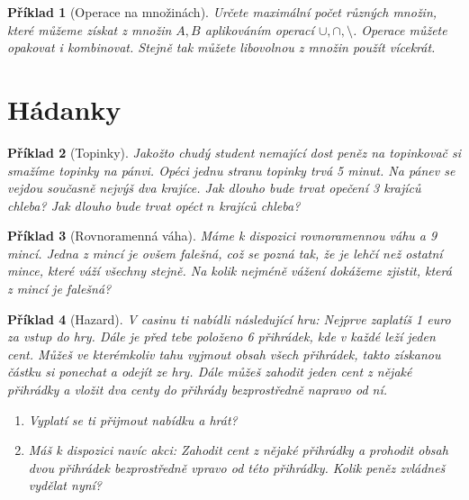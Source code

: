 \documentclass[10pt]{article}
\theoremstyle{definitionstyle}
\theoremstyle{problemstyle}
\newtheorem{problem}{Příklad}
\begin{document}
\begin{problem}[Operace na množinách]
Určete maximální počet různých množin, které můžeme získat z množin $A,B$ aplikováním operací $\cup, \cap, \setminus$. Operace můžete opakovat i kombinovat. Stejně tak můžete libovolnou z množin použít vícekrát.
\end{problem}

\section{Hádanky}

\begin{problem}[Topinky]
Jakožto chudý student nemající dost peněz na topinkovač si smažíme topinky na pánvi. Opéci jednu stranu topinky trvá 5 minut. Na pánev se vejdou současně nejvýš dva krajíce. Jak dlouho bude trvat opečení 3 krajíců chleba? Jak dlouho bude trvat opéct $n$ krajíců chleba?
\end{problem}

\begin{problem}[Rovnoramenná váha]
Máme k dispozici rovnoramennou váhu a 9 mincí. Jedna z mincí je ovšem falešná, což se pozná tak, že je lehčí než ostatní mince, které váží všechny stejně. Na kolik nejméně vážení dokážeme zjistit, která z mincí je falešná?
\end{problem}

\begin{problem}[Hazard]
V casinu ti nabídli následující hru: Nejprve zaplatíš 1 euro za vstup do hry. Dále je před tebe položeno 6 přihrádek, kde v každé leží jeden cent. Můžeš ve kterémkoliv tahu vyjmout obsah všech přihrádek, takto získanou částku si ponechat a odejít ze hry. Dále můžeš zahodit jeden cent z nějaké přihrádky a vložit dva centy do přihrády bezprostředně napravo od ní.

\begin{enumerate}[label=(\alph*)]
\item Vyplatí se ti přijmout nabídku a hrát?
\item Máš k dispozici navíc akci: Zahodit cent z nějaké přihrádky a prohodit obsah dvou přihrádek bezprostředně vpravo od této přihrádky. Kolik peněz zvládneš vydělat nyní?
\end{enumerate}

\end{problem}

\vspace{1cm}
\end{document}
